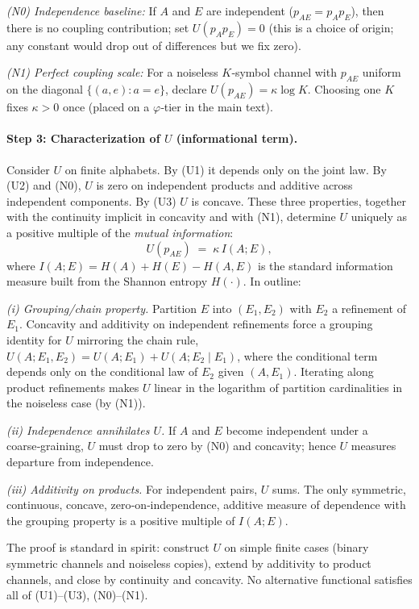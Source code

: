 \documentclass[11pt]{article}
\begin{document}
\emph{(N0) Independence baseline:} If $A$ and $E$ are independent ($p_{AE}=p_A p_E$), then there is no coupling contribution; set $U(p_A p_E)=0$ (this is a choice of origin; any constant would drop out of differences but we fix zero).

\emph{(N1) Perfect coupling scale:} For a noiseless $K$‑symbol channel with $p_{AE}$ uniform on the diagonal $\{(a,e):a=e\}$, declare $U(p_{AE})=\kappa\log K$. Choosing one $K$ fixes $\kappa>0$ once (placed on a $\varphi$‑tier in the main text).

\paragraph{Step 3: Characterization of $U$ (informational term).}
Consider $U$ on finite alphabets. By (U1) it depends only on the joint law. By (U2) and (N0), $U$ is zero on independent products and additive across independent components. By (U3) $U$ is concave. These three properties, together with the continuity implicit in concavity and with (N1), determine $U$ uniquely as a positive multiple of the \emph{mutual information}:
\[
U(p_{AE})\;=\;\kappa\, I(A;E),
\]
where $I(A;E)=H(A)+H(E)-H(A,E)$ is the standard information measure built from the Shannon entropy $H(\cdot)$. In outline:

\emph{(i) Grouping/chain property.} Partition $E$ into $(E_1,E_2)$ with $E_2$ a refinement of $E_1$. Concavity and additivity on independent refinements force a grouping identity for $U$ mirroring the chain rule, $U(A;E_1,E_2)=U(A;E_1)+U(A;E_2\mid E_1)$, where the conditional term depends only on the conditional law of $E_2$ given $(A,E_1)$. Iterating along product refinements makes $U$ linear in the logarithm of partition cardinalities in the noiseless case (by (N1)).

\emph{(ii) Independence annihilates $U$.} If $A$ and $E$ become independent under a coarse‑graining, $U$ must drop to zero by (N0) and concavity; hence $U$ measures departure from independence.

\emph{(iii) Additivity on products.} For independent pairs, $U$ sums. The only symmetric, continuous, concave, zero‑on‑independence, additive measure of dependence with the grouping property is a positive multiple of $I(A;E)$.

The proof is standard in spirit: construct $U$ on simple finite cases (binary symmetric channels and noiseless copies), extend by additivity to product channels, and close by continuity and concavity. No alternative functional satisfies all of (U1)–(U3), (N0)–(N1).
\end{document}
